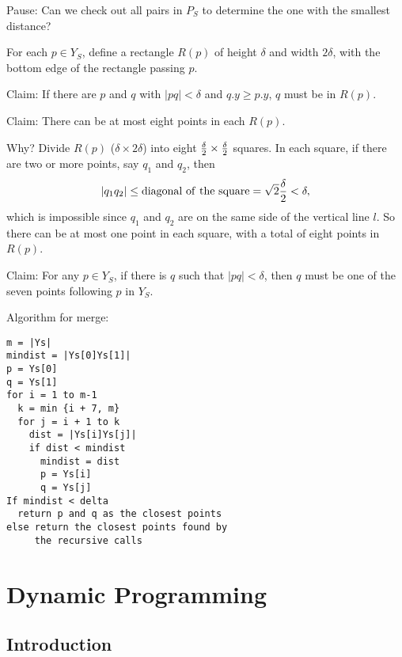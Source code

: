 \documentclass{article}
\begin{document}
\begin{itemize}
Pause: Can we check out all pairs in $P_S$ to determine the one with
the smallest distance?

For each $p\in Y_S$, define a rectangle $R(p)$ of height $\delta$
and width $2\delta$, with the bottom edge of the rectangle passing $p$.

Claim: If there are $p$ and $q$ with $|pq|<\delta$ and $q.y\ge p.y$,
$q$ must be in $R(p)$.

Claim: There can be at most eight points in each $R(p)$.

Why? Divide $R(p)$ ($\delta\times2\delta$) into eight
${\delta\over2}\times{\delta\over2}$ squares. In each square,
if there are two or more points, say $q_1$ and $q_2$, then
$$|q_1q_2|\le{\rm diagonal\ of\ the\ square}={\sqrt 2}{\delta\over2}
<\delta,$$
which is impossible since $q_1$ and $q_2$ are on the same side of the
vertical line $l$. So there can be at most one point in each square,
with a total of eight points in $R(p)$.

Claim: For any $p\in Y_S$, if there is $q$ such that $|pq|<\delta$,
then $q$ must be one of the seven points following $p$ in $Y_S$.

Algorithm for merge:

\begin{verbatim}
m = |Ys|
mindist = |Ys[0]Ys[1]|
p = Ys[0]
q = Ys[1]
for i = 1 to m-1
  k = min {i + 7, m}
  for j = i + 1 to k
    dist = |Ys[i]Ys[j]|
    if dist < mindist
      mindist = dist
      p = Ys[i]
      q = Ys[j]
If mindist < delta
  return p and q as the closest points
else return the closest points found by
     the recursive calls
\end{verbatim}

\end{itemize}

\newpage

\section{Dynamic Programming}

\subsection{Introduction}

\end{document}
